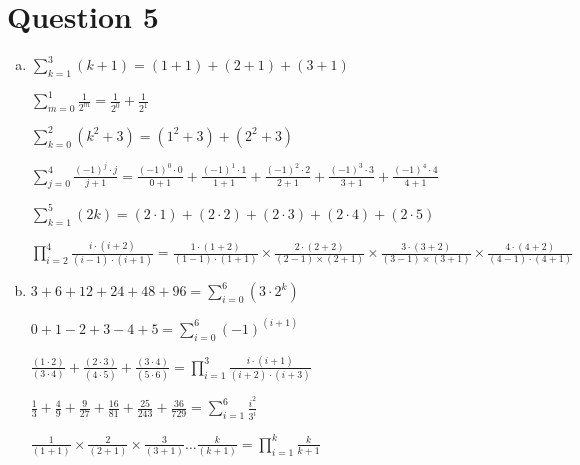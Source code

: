 \documentclass[12pt]{article}
\begin{document}
\section*{Question 5}

\begin{enumerate}[a)]
    \item
        $\sum\limits_{k=1}^3 (k + 1) = (1 + 1) + (2 + 1) + (3 + 1)$

        $\sum\limits_{m=0}^1 \frac{1}{2^m} = \frac{1}{2^0} + \frac{1}{2^1}$

        $\sum\limits_{k=0}^2 (k^2 + 3) = (1^2 + 3) + (2^2 + 3)$

        $\sum\limits_{j=0}^4 \frac{(-1)^j \cdot j}{j + 1} = \frac{(-1)^0 \cdot 0}{0 + 1} + \frac{(-1)^1 \cdot 1}{1 + 1} + \frac{(-1)^2 \cdot 2}{2 + 1} + \frac{(-1)^3  \cdot 3}{3 + 1} + \frac{(-1)^4 \cdot 4}{4 + 1}$

        $\sum\limits_{k=1}^5 (2k) = (2 \cdot 1) + (2 \cdot 2) + (2 \cdot 3) + (2 \cdot 4) + (2 \cdot 5)$

        $\prod\limits_{i=2}^4 \frac{i \cdot (i + 2)}{(i - 1) \cdot (i + 1)} = \frac{1 \cdot (1 + 2)}{(1 - 1) \cdot (1 + 1)} \times \frac{2 \cdot (2 + 2)}{(2 - 1) \times (2 + 1)} \times \frac{3 \cdot (3 + 2)}{(3 - 1) \times (3 + 1)} \times \frac{4 \cdot (4 + 2)}{(4 - 1) \cdot (4 + 1)}$
    \bigskip

    \item

        $3 + 6 + 12 + 24 + 48 + 96 = \sum\limits_{i=0}^6 (3 \cdot 2^k)$

        $0 + 1 - 2 + 3 - 4 + 5 = \sum\limits_{i=0}^6 (-1)^(i+1)$

        $\frac{(1 \cdot 2)}{(3 \cdot 4)} + \frac{(2 \cdot 3)}{(4 \cdot 5)} + \frac{(3 \cdot 4)}{(5 \cdot 6)} = \prod\limits_{i=1}^3 \frac{i \cdot (i + 1)}{(i + 2) \cdot (i + 3)}$

        $\frac{1}{3} + \frac{4}{9} + \frac{9}{27} + \frac{16}{81} + \frac{25}{243} + \frac{36}{729} = \sum\limits_{i=1}^6 \frac{i^2}{3^i}$

        $\frac{1}{(1 + 1)} \times \frac{2}{(2 + 1)} \times \frac{3}{(3 + 1)} \dots \frac{k}{(k + 1)} = \prod\limits_{i=1}^k \frac{k}{k + 1}$

\end{enumerate}
\end{document}
